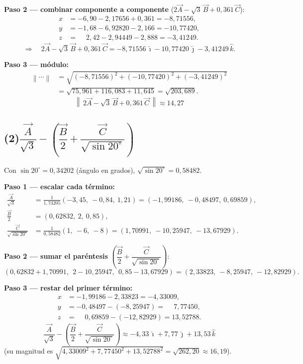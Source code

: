 \documentclass[12pt,letterpaper]{article}
\newcommand{\ii}{\hat{\imath}}
\newcommand{\jj}{\hat{\jmath}}
\newcommand{\kk}{\hat{k}}
\begin{document}
\noindent\textbf{Paso 2 — combinar componente a componente} ($2\vec{A}-\sqrt{3}\,\vec{B}+0{,}361\,\vec{C}$):
\begin{align*}
    x &= -6{,}90 - 2{,}17656 + 0{,}361 = -8{,}71556,\\
    y &= -1{,}68 - 6{,}92820 - 2{,}166 = -10{,}77420,\\
    z &= \phantom{-}2{,}42 - 2{,}94449 - 2{,}888 = -3{,}41249.
\end{align*}
\[
    \Rightarrow\quad 2\vec{A}-\sqrt{3}\,\vec{B}+0{,}361\,\vec{C}
    = -8{,}71556\,\ii - 10{,}77420\,\jj - 3{,}41249\,\kk.
\]

\noindent\textbf{Paso 3 — m\'odulo:}
\begin{align*}
    \left\lVert\cdots\right\rVert
    &= \sqrt{(-8{,}71556)^2 + (-10{,}77420)^2 + (-3{,}41249)^2}\\
    &= \sqrt{75{,}961 + 116{,}083 + 11{,}645} = \sqrt{203{,}689}.
\end{align*}
\[
    \boxed{\left\lVert\, 2\vec{A} - \sqrt{3}\,\vec{B} + 0{,}361\,\vec{C} \,\right\rVert \approx 14{,}27}
\]

\subsection*{(2)\quad $\dfrac{\vec{A}}{\sqrt{3}} - \left(\dfrac{\vec{B}}{2} + \dfrac{\vec{C}}{\sqrt{\sin 20^\circ}}\right)$}

\noindent Con $\sin 20^\circ = 0{,}34202$ (\'angulo en grados), $\sqrt{\sin 20^\circ} = 0{,}58482$.

\noindent\textbf{Paso 1 — escalar cada t\'ermino:}
\begin{align*}
    \frac{\vec{A}}{\sqrt{3}} &= \frac{1}{1{,}73205}(-3{,}45,\ -0{,}84,\ 1{,}21)
        = (-1{,}99186,\ -0{,}48497,\ 0{,}69859),\\
    \frac{\vec{B}}{2} &= (0{,}62832,\ 2,\ 0{,}85),\\
    \frac{\vec{C}}{\sqrt{\sin 20^\circ}} &= \frac{1}{0{,}58482}(1,\ -6,\ -8)
        = (1{,}70991,\ -10{,}25947,\ -13{,}67929).
\end{align*}

\noindent\textbf{Paso 2 — sumar el par\'entesis} $\left(\dfrac{\vec{B}}{2}+\dfrac{\vec{C}}{\sqrt{\sin 20^\circ}}\right)$:
\[
    (0{,}62832+1{,}70991,\ \ 2-10{,}25947,\ \ 0{,}85-13{,}67929)
    = (2{,}33823,\ -8{,}25947,\ -12{,}82929).
\]

\noindent\textbf{Paso 3 — restar del primer t\'ermino:}
\begin{align*}
    x &= -1{,}99186 - 2{,}33823 = -4{,}33009,\\
    y &= -0{,}48497 - (-8{,}25947) = \phantom{-}7{,}77450,\\
    z &= \phantom{-}0{,}69859 - (-12{,}82929) = 13{,}52788.
\end{align*}
\[
    \boxed{\dfrac{\vec{A}}{\sqrt{3}} - \left(\dfrac{\vec{B}}{2} + \dfrac{\vec{C}}{\sqrt{\sin 20^\circ}}\right)
    \approx -4{,}33\,\ii + 7{,}77\,\jj + 13{,}53\,\kk}
\]
(su magnitud es $\sqrt{4{,}33009^2+7{,}77450^2+13{,}52788^2}=\sqrt{262{,}20}\approx 16{,}19$).
\end{document}
